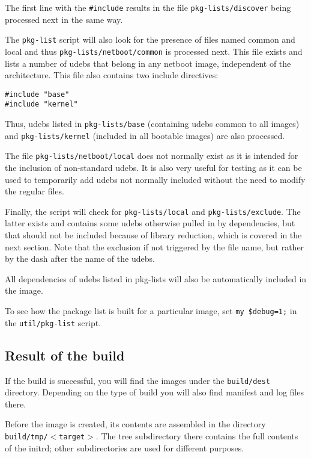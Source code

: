 \documentclass[a4paper,10pt]{article}
\begin{document}
The first line with the \texttt{\#include} results in the file \texttt{pkg-lists/discover} being processed next in the same way. 

The \texttt{pkg-list} script will also look for the presence of files named common and local and thus \texttt{pkg-lists/netboot/common} is processed next. This file exists and lists a number of udebs that belong in any netboot image, independent of the architecture. This file also contains two include directives:

\begin{verbatim}
#include "base"
#include "kernel"
\end{verbatim}

Thus, udebs listed in \texttt{pkg-lists/base} (containing udebs common to all images) and \texttt{pkg-lists/kernel} (included in all bootable images) are also processed. 

The file \texttt{pkg-lists/netboot/local} does not normally exist as it is intended for the inclusion of non-standard udebs. It is also very useful for testing as it can be used to temporarily add udebs not normally included without the need to modify the regular files. 

Finally, the script will check for \texttt{pkg-lists/local} and \texttt{pkg-lists/exclude}. The latter exists and contains some udebs otherwise pulled in by dependencies, but that should not be included because of library reduction, which is covered in the next section. Note that the exclusion if not triggered by the file name, but rather by the dash after the name of the udebs. 

All dependencies of udebs listed in pkg-lists will also be automatically included in the image. 

To see how the package list is built for a particular image, set \texttt{my \$debug=1;} in the \texttt{util/pkg-list} script. 


\subsection{Result of the build}
If the build is successful, you will find the images under the \texttt{build/dest} directory. Depending on the type of build you will also find manifest and log files there. 

Before the image is created, its contents are assembled in the directory \texttt{build/tmp/$<$target$>$}. The tree subdirectory there contains the full contents of the initrd; other subdirectories are used for different purposes. 
\end{document}
